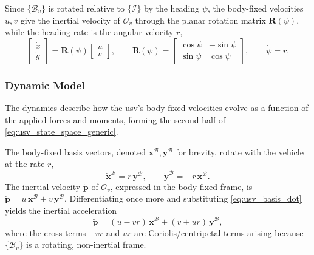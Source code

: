Since $\{\mathcal{B}_v\}$ is rotated relative to $\{\mathcal{I}\}$ by the heading $\psi$, the body-fixed velocities $u, v$ give the inertial velocity of $\mathcal{O}_v$ through the planar rotation matrix $\mathbf{R}(\psi)$, while the heading rate is the angular velocity $r$,
\begin{equation}
    \label{eq:usv_kinematics_planar}
    \begin{bmatrix} \dot{x} \\ \dot{y} \end{bmatrix} = \mathbf{R}(\psi)\begin{bmatrix} u \\ v \end{bmatrix}, \qquad
    \mathbf{R}(\psi) = \begin{bmatrix} \cos\psi & -\sin\psi \\ \sin\psi & \cos\psi \end{bmatrix}, \qquad
    \dot{\psi} = r.
\end{equation}

\subsubsection{Dynamic Model}
\label{subsec:mod_usv_dynamics}

The dynamics describe how the \gls{usv}'s body-fixed velocities evolve as a function of the applied forces and moments, forming the second half of \eqref{eq:usv_state_space_generic}.

The body-fixed basis vectors, denoted $\mathbf{x}^{\mathcal{B}}, \mathbf{y}^{\mathcal{B}}$ for brevity, rotate with the vehicle at the rate $r$,
\begin{equation}
    \dot{\mathbf{x}}^{\mathcal{B}} = r\,\mathbf{y}^{\mathcal{B}}, \qquad \dot{\mathbf{y}}^{\mathcal{B}} = -r\,\mathbf{x}^{\mathcal{B}}.
    \label{eq:usv_basis_dot}
\end{equation}
The inertial velocity $\dot{\mathbf{p}}$ of $\mathcal{O}_v$, expressed in the body-fixed frame, is $\dot{\mathbf{p}} = u\,\mathbf{x}^{\mathcal{B}} + v\,\mathbf{y}^{\mathcal{B}}$. Differentiating once more and substituting \eqref{eq:usv_basis_dot} yields the inertial acceleration
\begin{equation}
    \ddot{\mathbf{p}} = (\dot{u} - vr)\,\mathbf{x}^{\mathcal{B}} + (\dot{v} + ur)\,\mathbf{y}^{\mathcal{B}},
    \label{eq:usv_pddot_body_frame}
\end{equation}
where the cross terms $-vr$ and $ur$ are Coriolis/centripetal terms arising because $\{\mathcal{B}_v\}$ is a rotating, non-inertial frame.

